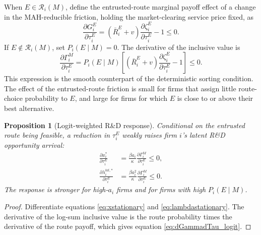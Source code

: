 \documentclass[12pt]{article}
\newtheorem{proposition}{Proposition}
\newcommand{\1}{\mathbf{1}}
\newcommand{\calR}{\mathcal{R}}
\begin{document}
When $E\in\calR_i(M)$, define the entrusted-route marginal payoff effect of a change in the MAH-reducible friction, holding the market-clearing service price fixed, as
\begin{equation}
    \frac{\partial G_i^E}{\partial \tau_i^E}
    =
    \left(\bar R_i^E+v\right)
    \frac{\partial \zeta_i^E}{\partial \tau_i^E}
    -1
    \le0.
    \label{eq:dGEdtau}
\end{equation}
If $E\notin\calR_i(M)$, set $P_i(E\mid M)=0$. The derivative of the inclusive value is
\begin{equation}
    \frac{\partial \Gamma_i^M}{\partial \tau_i^E}
    =
    P_i(E\mid M)
    \left[
    \left(\bar R_i^E+v\right)
    \frac{\partial \zeta_i^E}{\partial \tau_i^E}
    -1
    \right]
    \le0.
    \label{eq:dGammadTau_logit}
\end{equation}
This expression is the smooth counterpart of the deterministic sorting condition. The effect of the entrusted-route friction is small for firms that assign little route-choice probability to $E$, and large for firms for which $E$ is close to or above their best alternative.

\begin{proposition}[Logit-weighted R\&D response]
\label{prop:logit_weighted_response}
Conditional on the entrusted route being feasible, a reduction in $\tau_i^E$ weakly raises firm $i$'s latent R\&D opportunity arrival:
\begin{align}
    \frac{\partial x_i^*}{\partial \tau_i^E}
    &=
    \frac{\beta a_i}{\kappa}
    \frac{\partial \Gamma_i^M}{\partial \tau_i^E}
    \le0,
    \label{eq:dxdtau_logit}\\
    \frac{\partial \lambda_i^{lat,*}}{\partial \tau_i^E}
    &=
    \frac{\beta a_i^2}{\kappa}
    \frac{\partial \Gamma_i^M}{\partial \tau_i^E}
    \le0.
    \label{eq:dLambdadtau_logit}
\end{align}
The response is stronger for high-$a_i$ firms and for firms with high $P_i(E\mid M)$.
\end{proposition}

\begin{proof}
Differentiate equations \eqref{eq:xstationary} and \eqref{eq:lambdastationary}. The derivative of the log-sum inclusive value is the route probability times the derivative of the route payoff, which gives equation \eqref{eq:dGammadTau_logit}.
\end{proof}
\end{document}
